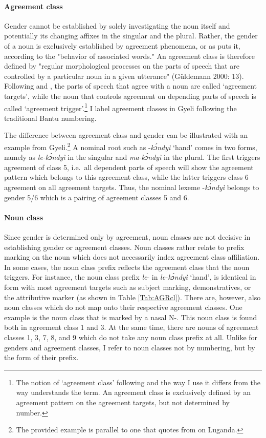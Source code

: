 \paragraph{Agreement class} Gender cannot be established by solely investigating the noun itself and potentially its changing affixes in the singular and the plural. Rather, the gender of a noun is exclusively established by agreement phenomena, or as \citet{hockett58} puts it, according to the "behavior of associated words." An agreement class is therefore defined by "regular morphological processes on the parts of speech that are controlled by a particular noun in a given utterance" (Güldemann 2000: 13). Following \citet{corbett91} and \citet{guldemann2000}, the parts of speech that agree with a noun are called `agreement targets', while the noun that controls agreement on depending parts of speech is called `agreement trigger'.\footnote{The notion of `agreement class' following \citet{guldemann2000} and the way I use it differs from the way \citet[147]{corbett91} understands the term. An agreement class is exclusively defined by an agreement pattern on the agreement targets, but not determined by number.} I label agreement classes in Gyeli following the traditional Bantu numbering. 

The difference between agreement class and gender can be illustrated with an example from Gyeli.\footnote{The provided example is parallel to one that \citet[13]{guldemann2000} quotes from \citet[125]{nichols92} on Luganda.} A nominal root such as -{\itshape kɔ́ndyì} `hand' comes in two forms, namely as {\itshape le-kɔ́ndyì} in the singular and {\itshape ma-kɔ́ndyì} in the plural. The first triggers agreement of class 5, i.e.\ all dependent parts of speech will show the agreement pattern which belongs to this agreement class,  while the latter triggers class 6 agreement on all agreement targets. Thus, the nominal lexeme -{\itshape kɔ́ndyì} belongs to gender 5/6 which is a pairing of agreement classes 5 and 6. 

\paragraph{Noun class} Since gender is determined only by agreement, noun classes are not decisive in establishing gender or agreement classes. Noun classes rather relate to prefix marking on the noun which does not necessarily index agreement class affiliation.  In some cases, the noun class prefix reflects the agreement class that the noun triggers. For instance, the noun class prefix {\itshape le}- in {\itshape le-kɔ́ndyì} `hand', is identical in form with most agreement targets such as subject marking, demonstratives, or the attributive marker (as shown in Table \ref{Tab:AGRcl}). There are, however, also noun classes which do not map onto their respective agreement classes. One example is the noun class that is marked by a nasal N-. This noun class is found both in agreement class 1 and 3. At the same time, there are nouns of agreement classes 1, 3, 7, 8, and 9 which do not take any noun class prefix at all. Unlike for genders and agreement classes, I refer to noun classes not by numbering, but by the form of their prefix.

